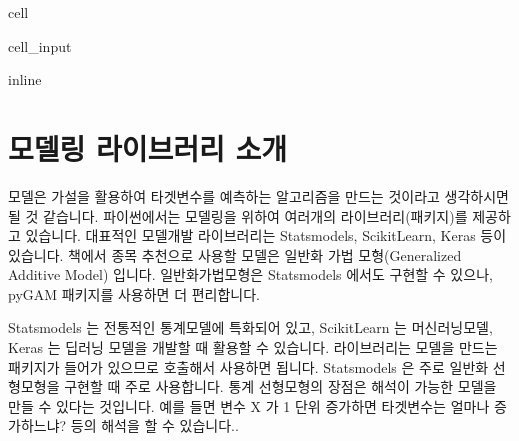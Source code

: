 \documentclass[letterpaper,10pt,english]{jupyterBook}
\begin{document}
\begin{sphinxuseclass}{cell}\begin{sphinxVerbatimInput}

\begin{sphinxuseclass}{cell_input}
\begin{sphinxVerbatim}[commandchars=\\\{\}]
   
 inline
   
   
   
 
  
\end{sphinxVerbatim}

\end{sphinxuseclass}\end{sphinxVerbatimInput}

\end{sphinxuseclass}

\section{모델링 라이브러리 소개}
\label{\detokenize{chapter5/5.2.2_Modeling_Library:id1}}\label{\detokenize{chapter5/5.2.2_Modeling_Library::doc}}
\sphinxAtStartPar
모델은 가설을 활용하여 타겟변수를 예측하는 알고리즘을 만드는 것이라고 생각하시면 될 것 같습니다. 파이썬에서는 모델링을 위하여 여러개의 라이브러리(패키지)를 제공하고 있습니다. 대표적인 모델개발 라이브러리는 Statsmodels, Scikit\sphinxhyphen{}Learn, Keras 등이 있습니다. 책에서 종목 추천으로 사용할 모델은 일반화 가법 모형(Generalized Additive Model) 입니다. 일반화가법모형은 Statsmodels 에서도 구현할 수 있으나, pyGAM 패키지를 사용하면 더 편리합니다.

\sphinxAtStartPar
Statsmodels 는 전통적인 통계모델에 특화되어 있고, Scikit\sphinxhyphen{}Learn 는 머신러닝모델, Keras 는 딥러닝 모델을 개발할 때 활용할 수 있습니다. 라이브러리는 모델을 만드는 패키지가 들어가 있으므로 호출해서 사용하면 됩니다. Statsmodels 은 주로 일반화 선형모형을 구현할 때 주로 사용합니다. 통계 선형모형의 장점은 해석이 가능한 모델을 만들 수 있다는 것입니다. 예를 들면 변수 X 가 1 단위 증가하면 타겟변수는 얼마나 증가하느냐? 등의 해석을 할 수 있습니다..
\end{document}
